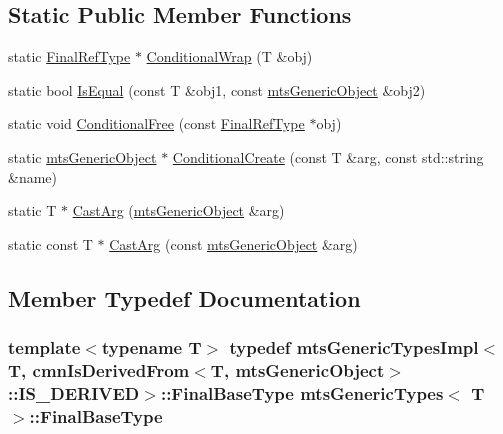 \subsection*{Static Public Member Functions}
\begin{DoxyCompactItemize}
\item 
static \hyperlink{classmts_generic_types_a368d13fc9b20309385e9a40bbbe3c2ca}{Final\+Ref\+Type} $\ast$ \hyperlink{classmts_generic_types_ab22b7952ea3623557a6e877f23a80623}{Conditional\+Wrap} (T \&obj)
\item 
static bool \hyperlink{classmts_generic_types_a1b42048a6b44b01e8dd8c1e0ee704f92}{Is\+Equal} (const T \&obj1, const \hyperlink{classmts_generic_object}{mts\+Generic\+Object} \&obj2)
\item 
static void \hyperlink{classmts_generic_types_a20e6eb89673405eb8cac1e62524e9d3a}{Conditional\+Free} (const \hyperlink{classmts_generic_types_a368d13fc9b20309385e9a40bbbe3c2ca}{Final\+Ref\+Type} $\ast$obj)
\item 
static \hyperlink{classmts_generic_object}{mts\+Generic\+Object} $\ast$ \hyperlink{classmts_generic_types_ad750804b23e5bf0ae4edeb98e020e8e4}{Conditional\+Create} (const T \&arg, const std\+::string \&name)
\item 
static T $\ast$ \hyperlink{classmts_generic_types_a17084cf81607685aba94c634da7a4a54}{Cast\+Arg} (\hyperlink{classmts_generic_object}{mts\+Generic\+Object} \&arg)
\item 
static const T $\ast$ \hyperlink{classmts_generic_types_ad2f8a4222ff37ed9c5d0ee593fec60f3}{Cast\+Arg} (const \hyperlink{classmts_generic_object}{mts\+Generic\+Object} \&arg)
\end{DoxyCompactItemize}


\subsection{Member Typedef Documentation}
\hypertarget{classmts_generic_types_a3244938027eee22c5703687330f0c172}{}
\subsubsection[{Final\+Base\+Type}]{\setlength{\rightskip}{0pt plus 5cm}template$<$typename T$>$ typedef {\bf mts\+Generic\+Types\+Impl}$<$T, {\bf cmn\+Is\+Derived\+From}$<$T, {\bf mts\+Generic\+Object}$>$\+::I\+S\+\_\+\+D\+E\+R\+I\+V\+E\+D$>$\+::{\bf Final\+Base\+Type} {\bf mts\+Generic\+Types}$<$ T $>$\+::{\bf Final\+Base\+Type}}\label{classmts_generic_types_a3244938027eee22c5703687330f0c172}
\hypertarget{classmts_generic_types_a368d13fc9b20309385e9a40bbbe3c2ca}{}

